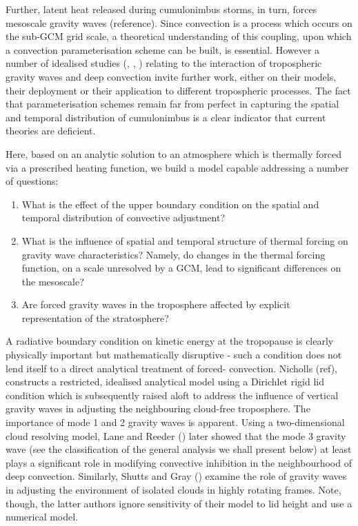 \documentclass[a4paper,10pt]{article}
\begin{document}
Further, latent heat released during cumulonimbus storms, in turn, forces mesoscale gravity waves (reference). Since convection is a process which occurs on the sub-GCM grid scale, a theoretical understanding of this coupling, upon which a convection parameterisation scheme can be built, is essential. However a number of idealised studies (\citep{lindzen1974wave}, \citep{raymond1983wave}, \citep{emanuel1986air}) relating to the interaction of tropospheric gravity waves and deep convection invite further work, either on their models, their deployment or their application to different tropospheric processes. The fact that parameterisation schemes remain far from perfect in capturing the spatial and temporal distribution of cumulonimbus is a clear indicator that current theories are deficient.

Here, based on an analytic solution to an atmosphere which is thermally forced via a prescribed heating function, we build a model capable addressing a number of questions:
\begin{enumerate}
 \item What is the effect of the upper boundary condition on the spatial and temporal distribution of convective adjustment?
 \item What is the influence of spatial and temporal structure of thermal forcing on gravity wave characteristics? Namely, do changes in the thermal forcing function, on a scale unresolved by a GCM, lead to significant differences on the mesoscale?
 \item Are forced gravity waves in the troposphere affected by explicit representation of the stratosphere?
\end{enumerate}

A radiative boundary condition on kinetic energy at the tropopause is clearly physically important but mathematically disruptive - such a condition does not lend itself to a direct analytical treatment of forced-
convection. Nicholls (ref), constructs a restricted, idealised analytical model using a Dirichlet rigid lid condition which is subsequently raised aloft to address the influence of vertical gravity waves in adjusting the 
neighbouring cloud-free troposphere. The importance of mode 1 and 2 gravity waves is apparent. Using a two-dimensional cloud resolving model, Lane and Reeder (\citeyear{lane2001convectively}) later 
showed that the mode 3 gravity wave (see the classification of the general analysis we shall present below) at least plays a significant role in modifying convective inhibition in the neighbourhood of deep 
convection. Similarly, Shutts and Gray (\citeyear{shutts1994numerical}) examine the role of gravity waves in adjusting the environment of isolated clouds in highly rotating frames. Note, though, the latter authors 
ignore sensitivity of their model to lid height and use a numerical model.
\end{document}
